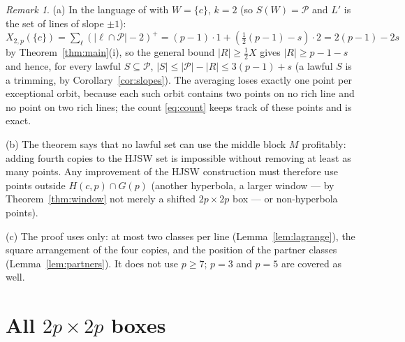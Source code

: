 \documentclass[11pt]{article}
\theoremstyle{remark}
\newtheorem{remark}[theorem]{Remark}
\newcommand{\Hc}{H(c,p)}
\newcommand{\Gp}{G(p)}
\newcommand{\Pset}{\mathcal{P}}
\begin{document}
\begin{remark}\label{rem:kns}
(a) In the language of \cite[Constr.~3.2, Rem.~3.4]{KNS25} with $W=\{c\}$, $k=2$ (so $S(W)=\Pset$ and $L'$ is the set of
lines of slope $\pm1$): $X_{2,p}(\{c\})=\sum_{\ell}(|\ell\cap\Pset|-2)^+=(p-1)\cdot1+(\tfrac12(p-1)-s)\cdot2=2(p-1)-2s$ by
Theorem~\ref{thm:main}(i), so the general bound $|R|\ge\tfrac12X$ gives $|R|\ge p-1-s$ and hence, for every lawful
$S\subseteq\Pset$, $|S|\le|\Pset|-|R|\le3(p-1)+s$ (a lawful $S$ is a trimming, by Corollary~\ref{cor:slopes}).  The
averaging loses exactly one point per exceptional orbit, because each such orbit contains two points on no rich line
and no point on two rich lines; the count \eqref{eq:count} keeps track of these points and is exact.

(b) The theorem says that no lawful set can use the middle block $M$ profitably: adding fourth copies to the HJSW
set is impossible without removing at least as many points.  Any improvement of the HJSW construction must therefore
use points outside $\Hc\cap\Gp$ (another hyperbola, a larger window --- by Theorem~\ref{thm:window} not merely a
shifted $2p\times2p$ box --- or non-hyperbola points).

(c) The proof uses only: at most two classes per line (Lemma~\ref{lem:lagrange}), the square arrangement of the four
copies, and the position of the partner classes (Lemma~\ref{lem:partners}).  It does not use $p\ge7$; $p=3$ and $p=5$
are covered as well.
\end{remark}

\section{All $2p\times2p$ boxes}\label{sec:window}
\end{document}
